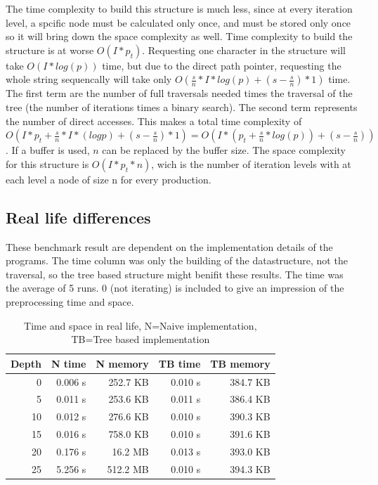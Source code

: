 \documentclass[11pt,a4paper]{article}
\begin{document}
The time complexity to build this structure is much less, since at every iteration level, a spcific node must be calculated only once, and must be stored only once so it will bring down the space complexity as well.
Time complexity to build the structure is at worse $O(I*p_t)$.
Requesting one character in the structure will take $O(I*log(p))$ time, but due to the direct path pointer, requesting the whole string sequencally will take only $O(\frac{s}{n} * I*log(p) + (s-\frac{s}{n}) * 1)$ time. The first term are the number of full traversals needed times the traversal of the tree (the number of iterations times a binary search). The second term represents the number of direct accesses. This makes a total time complexity of $O(I*p_t + \frac{s}{n} * I*(log p) + (s-\frac{s}{n}) * 1) = O(I * (p_t + \frac{s}{n} * log(p)) + (s - \frac{s}{n}))$. If a buffer is used, $n$ can be replaced by the buffer size.
The space complexity for this structure is $O(I*p_t*n)$, wich is the number of iteration levels with at each level a node of size n for every production.

\subsection{Real life differences} %

These benchmark result are dependent on the implementation details of the programs. The time column was only the building of the datastructure, not the traversal, so the tree based structure might benifit these results. The time was the average of 5 runs. 0 (not iterating) is included to give an impression of the preprocessing time and space.

\begin{table}
\center
\begin{tabular}{r r r r r}
Depth & N time & N memory & TB time & TB memory \\ \hline
0  & 0.006 s & 252.7 KB & 0.010 s & 384.7 KB \\ \hline
5  & 0.011 s & 253.6 KB & 0.011 s & 386.4 KB \\ \hline
10 & 0.012 s & 276.6 KB & 0.010 s & 390.3 KB \\ \hline
15 & 0.016 s & 758.0 KB & 0.010 s & 391.6 KB \\ \hline
20 & 0.176 s &  16.2 MB & 0.013 s & 393.0 KB \\ \hline
25 & 5.256 s & 512.2 MB & 0.010 s & 394.3 KB \\
\end{tabular}
\caption{Time and space in real life, N=Naive implementation, TB=Tree based implementation}
\end{table}
\end{document}
